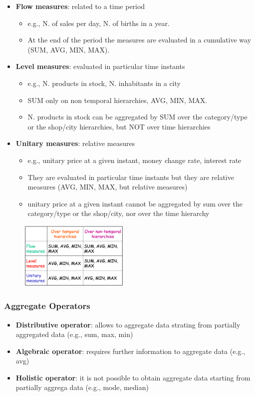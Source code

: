 \documentclass[10pt,a4paper]{article}
\begin{document}
\begin{itemize}
	\item \textbf{Flow measures}: related to a time period 
	\begin{itemize}
		\item e.g., N. of sales per day, N. of births in a year.
		\item  At the end of the period the measures are evaluated in a cumulative way (SUM, AVG, MIN, MAX).
	\end{itemize}
	\item \textbf{Level measures}: evaluated in particular time instants
	\begin{itemize}
		\item e.g., N. products in stock, N. inhabitants in a city
		\item SUM only on non temporal hierarchies, AVG, MIN, MAX.
		\item N. products in stock can be aggregated by SUM over the category/type or the shop/city hierarchies, but NOT over time hierarchies
\end{itemize}
	\item \textbf{Unitary measures}: relative measures 
	\begin{itemize}
		\item e.g., unitary price at a given instant, money change rate, interest rate
		\item They are evaluated in particular time instants but they are relative measures  (AVG, MIN, MAX, but relative measures)
		\item unitary price at a given instant cannot be aggregated by sum over the category/type or the shop/city, nor over the time hierarchy
	\end{itemize}		
\end{itemize}
\begin{figure}[htp]
\center
\includegraphics[width=150pt]{images/measures-categories}\hfill
\end{figure}
\subsubsection{Aggregate Operators}
\begin{itemize}
	\item \textbf{Distributive operator}: allows to aggregate data strating from partially aggregated data (e.g., sum, max, min)
	\item \textbf{Algebraic operator}: requires further information to aggregate data (e.g., avg)
	\item \textbf{Holistic operator}: it is not possible to obtain aggregate data starting from partially aggrega data (e.g., mode, median)
\end{itemize}
\end{document}
